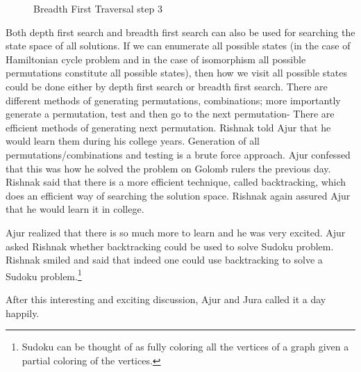 \begin{figure}
\begin{center}
\caption{ Breadth First Traversal step 3}\label{20g10}
\end{center}
\end{figure}

Both depth first search and breadth first search can also be used for searching the state space of all solutions. If we can enumerate all possible states (in the case of Hamiltonian cycle problem and in the case of isomorphism all possible permutations constitute all possible states), then how we visit all possible states could be done either by depth first search or breadth first search.
There are different methods of generating permutations, combinations; more importantly generate a permutation, test and then go to the next permutation- There are efficient methods of generating next permutation. Rishnak told Ajur that he would learn them during his college years.
Generation of all permutations/combinations and testing is a brute force approach. Ajur confessed that this was how he solved the problem on Golomb rulers the previous day. Rishnak said that there is a more efficient technique, called backtracking, which does an efficient way of searching the solution space. Rishnak again assured Ajur that he would learn it in college.

Ajur realized that there is so much more to learn and he was very excited. Ajur asked Rishnak whether backtracking could be used to solve Sudoku problem. Rishnak smiled and said that indeed one could use backtracking to solve a Sudoku problem.\footnote{Sudoku can be thought of as fully coloring all the vertices of a graph given a partial coloring of the vertices.}

After this interesting and exciting discussion, Ajur and Jura called it a day happily.


